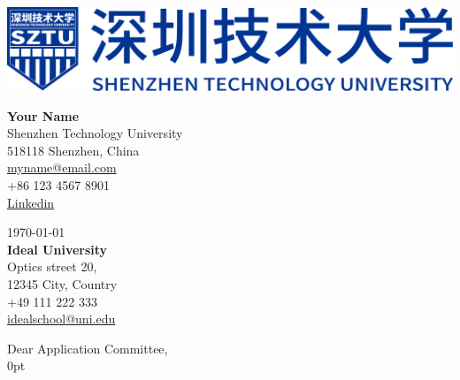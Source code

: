 \documentclass[11pt]{report}
\begin{document}
\begin{titlepage}


\vspace{-0.4em}
\begin{minipage}[t]{0.62\textwidth}
    {\vspace{-0.05in}\hspace{-0.05in}\includegraphics[width=\textwidth]{image/SZTU_header.pdf}}
\end{minipage}
\hfill
\begin{minipage}[t]{0.32\textwidth}
    \raggedleft
    \textbf{ Your Name} \\
    Shenzhen Technology University \\
    518118 Shenzhen, China \\
    \href{mailto:myname@email.com}{myname@email.com} \\
    +86 123 4567 8901 \\
    \href{https://www.linkedin.com/}{Linkedin}
\end{minipage}

\vspace{0.8em}


\raggedright
\today\\
\vspace{0.4em}
\textbf{Ideal University} \\
Optics street 20, \\
12345 City, Country \\
+49 111 222 333 \\
\href{mailto:idealschool@uni.edu}{idealschool@uni.edu} \\

\vspace{0.8em}

\raggedright Dear Application Committee,\\

\vspace{0.7em}
\justifying %
\setlength {\parindent} {0pt} %


\end{titlepage}
\end{document}
